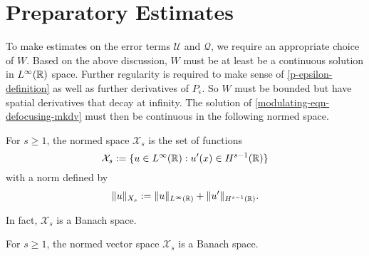\section{Preparatory Estimates}
To make estimates on the error terms \(\mathcal U\) and \(\mathcal Q\), we require an appropriate choice of \(W\). Based on the above discussion, \(W\) must be at least be a continuous solution in \(L^\infty(\mathbb{R})\) space. Further regularity is required to make sense of \cref{p-epsilon-definition} as well as further derivatives of \(P_\epsilon\). So \(W\) must be bounded but have spatial derivatives that decay at infinity. The solution of \cref{modulating-eqn-defocusing-mkdv} must then be continuous in the following normed space.
\begin{defn}
	For \(s\geq 1\), the normed space \(\mathcal X_s\) is the set of functions
	\begin{equation}
		\mathcal X_s := \{u \in L^\infty(\mathbb{R}) : u'(x) \in H^{s-1}(\mathbb{R})\}
	\end{equation}
	with a norm defined by 
	\begin{equation}
		\| u \|_{X_s} := \| u \|_{L^\infty(\mathbb{R})} + \|u'\|_{H^{s-1}(\mathbb{R})}.
	\end{equation}
\end{defn}
In fact, \(\mathcal X_s\) is a Banach space.
\begin{prop}
	For \(s\geq 1\), the normed vector space \(\mathcal X_s\) is a Banach space.
\end{prop}
